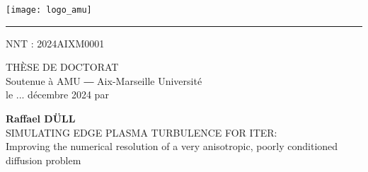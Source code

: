 \chead{}
\thispagestyle{empty}

\vspace{1em}

\begin{center}
	\begin{minipage}[c]{.5\linewidth}
		\raggedright\texttt{[image: logo\_amu]}
	\end{minipage}\hfill
	\begin{minipage}[c]{.5\linewidth}
	\end{minipage}\hfill
\end{center}


\begin{center}
	\begin{minipage}[c]{.77\linewidth}
		\textcolor{yellowamu}{\noindent\rule{\textwidth}{4pt}}
	\end{minipage}\hfill
	\begin{minipage}[c]{.23\linewidth}
		\raggedleft\textsf{NNT : 2024AIXM0001}
	\end{minipage}\hfill
\end{center}


\doublespacing
\begin{flushleft}
    \textsf{\HUGE\textcolor{blueamu}{THÈSE DE DOCTORAT}}\\
	\textsf{\Large Soutenue à AMU ― Aix-Marseille Université}\\
	\textsf{\Large le ... décembre 2024 par}\\
\end{flushleft}
\vspace{2em}
\begin{center}
	\textsf{\textbf{\Huge Raffael DÜLL}}\\
    \vspace{1em}
	\textsf{\LARGE SIMULATING EDGE PLASMA TURBULENCE FOR ITER:}\\ 
	\textsf{\Large Improving the numerical resolution of a very anisotropic, poorly conditioned diffusion problem}\\
\end{center}
\singlespacing

